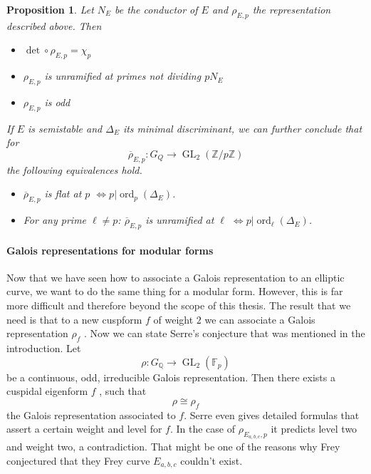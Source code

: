 \documentclass{article}
\theoremstyle{plain}%
\newtheorem{proposition}[theorem]{Proposition}
\theoremstyle{definition}
\theoremstyle{remark}
\newcommand{\GL}{\operatorname{GL}}
\begin{document}
\begin{proposition}\cite[chapter 1, theorem 2.11]{Cornell1997}\label{prop:rhoEpproperties} 
    Let \(N_E\) be the conductor of \(E\) and \(\rho_{E,p}\) the representation described above.
    Then
    \begin{itemize}
        \item \(\det \circ \rho_{E,p} = \chi_p\)
        \item \(\rho_{E,p}\) is unramified at primes not dividing \(pN_E\)
        \item \(\rho_{E, p}\) is odd
    \end{itemize}
    If \(E\) is semistable and \(\Delta_E\) its minimal discriminant, we can further conclude that for
    \[
        \overline{\rho}_{E,p}\colon G_Q \to \GL_2(\mathbb{Z}/p\mathbb{Z})  
    \]
    the following equivalences hold.
    \begin{itemize}
        \item \(\overline{\rho}_{E,p}\) is flat at \(p\) \(\Leftrightarrow p| \operatorname{ord}_p(\Delta_E)\).
        \item For any prime \(\ell \neq p\): 
        \(\overline{\rho}_{E,p}\) is unramified at \(\ell\) \(\Leftrightarrow p| \operatorname{ord}_\ell(\Delta_E)\).
    \end{itemize}
\end{proposition}

\paragraph{Galois representations for modular forms}
Now that we have seen how to associate a Galois representation to an elliptic curve, we want to
do the same thing for a modular form. However, this is far more difficult and therefore beyond 
the scope of this thesis.
The result that we need is that to a new cuspform \(f\) of weight \(2\) we can associate a 
Galois representation \(\rho_f\) \cite[see][section 9.5]{Diamond2007}.
Now we can state Serre's conjecture that was mentioned in the introduction.
Let
\[
    \rho\colon G_\mathbb{Q} \to \GL_2(\mathbb{F}_p)
\]
be a continuous, odd, irreducible Galois representation. 
Then there exists a cuspidal eigenform \(f\) , such that 
\[
    \rho \cong \rho_f
\]
the Galois representation associated to \(f\).
Serre even gives detailed formulas that assert a certain weight and level for \(f\).
In the case of \(\rho_{E_{a,b,c},p}\) it predicts level two and weight two, a contradiction.
That might be one of the reasons why Frey  conjectured that they Frey curve \(E_{a,b,c}\) couldn't exist.
\end{document}
